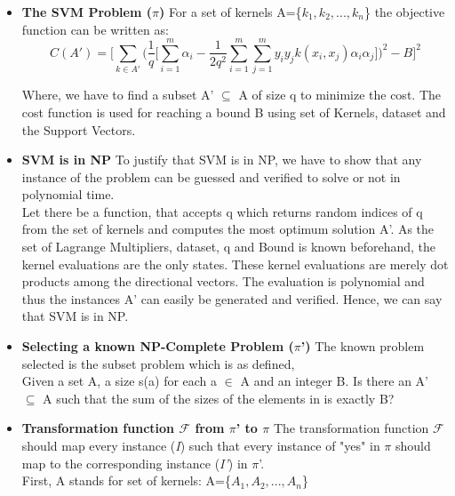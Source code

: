 \documentclass[12pt,a4paper,final]{report}
\begin{document}
{{{{{\begin{itemize}
\item
\textbf{The SVM Problem ($\pi$)}
\newline For a set of kernels A=\{$k_1,k_2,...,k_n$\} the objective function can be written as:\\

\begin{equation}
C(A')=	\Big[\sum_{k \in A'}^{}\Big(\frac{1}{q}\Big[\sum_{i=1}^{m} \alpha_i - \frac{1}{2q^2} \sum_{i=1}^{m}\sum_{j=1}^{m}y_iy_jk(x_i,x_j)\alpha_i\alpha_j\Big]\Big)^2- B\Big]^2
\end{equation}	
\newline 

Where, we have to find a subset A' $\subseteq$ A of size q to minimize the cost. The cost function is used for reaching a bound B using set of Kernels, dataset and the Support Vectors.\\
\item
\textbf{SVM is in NP}
\newline To justify that SVM is in NP, we have to show that any instance of the problem can be guessed and verified to solve or not in polynomial time.\\
Let there be a function, that accepts q which returns random indices of q from the set of kernels and computes the most optimum solution A'. As the set of Lagrange Multipliers, dataset, q and Bound is known beforehand, the kernel evaluations are the only states.  These kernel evaluations are merely dot products among the directional vectors. The evaluation is polynomial and thus the instances A' can easily be generated and verified. Hence, we can say that SVM is in NP.
\item
\textbf{Selecting a known NP-Complete Problem ($\pi$')}
\newline The known problem selected is the subset problem which is as defined,\\
Given a set A, a size s(a) for each a $\in$ A and an integer B. Is there an A' $\subseteq$ A such that the sum of the sizes of the elements in is exactly B?\\
\item
\textbf{Transformation function $\mathcal{F}$ from $\pi$' to $\pi$}
\newline The transformation function $\mathcal{F}$ should map every instance (\emph{I}) such that every instance of "yes" in $\pi$ should map to the corresponding instance (\emph{I'}) in $\pi$'.\\
First, A stands for set of kernels: A=\{$A_1,A_2,...,A_n$\} \\

\end{itemize}}}}}}
\end{document}
